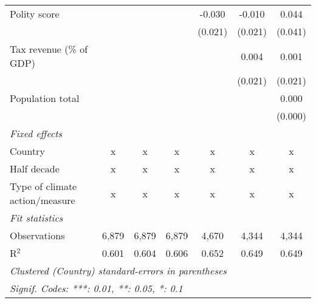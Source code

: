 \begin{tabular}{lcccccc}
   Polity score                                                 &         &                &                & -0.030         & -0.010         & 0.044\\   
                                                                &         &                &                & (0.021)        & (0.021)        & (0.041)\\   
   Tax revenue (\% of GDP)                                      &         &                &                &                & 0.004          & 0.001\\   
                                                                &         &                &                &                & (0.021)        & (0.021)\\   
   Population total                                             &         &                &                &                &                & 0.000\\   
                                                                &         &                &                &                &                & (0.000)\\   
   \emph{Fixed effects}\\
   Country                                                      & x       & x              & x              & x              & x              & x\\  
   Half decade                                                  & x       & x              & x              & x              & x              & x\\  
   Type of climate action/measure                               & x       & x              & x              & x              & x              & x\\  
   \midrule \emph{Fit statistics}\\
   Observations                                                 & 6,879   & 6,879          & 6,879          & 4,670          & 4,344          & 4,344\\  
   R$^2$                                                        & 0.601   & 0.604          & 0.606          & 0.652          & 0.649          & 0.649\\  
   \midrule
   \multicolumn{7}{l}{\emph{Clustered (Country) standard-errors in parentheses}}\\
   \multicolumn{7}{l}{\emph{Signif. Codes: ***: 0.01, **: 0.05, *: 0.1}}\\
\end{tabular}
\par\endgroup


